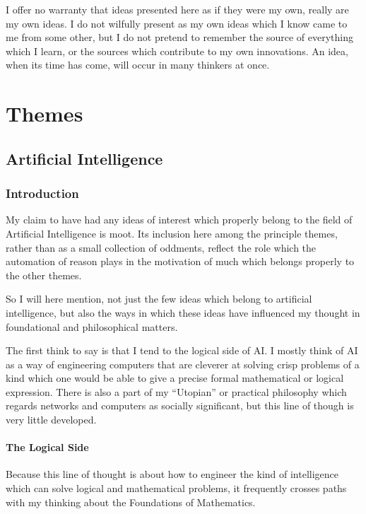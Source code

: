 \documentclass[10pt,titlepage]{book}
\begin{document}
I offer no warranty that ideas presented here as if they were my own, really are my own ideas.
I do not wilfully present as my own ideas which I know came to me from some other, but I do not pretend to remember the source of everything which I learn, or the sources which contribute to my own innovations.
An idea, when its time has come, will occur in many thinkers at once.

\part{Themes}

\chapter{Artificial Intelligence}

\section{Introduction}

My claim to have had any ideas of interest which properly belong to the field of Artificial Intelligence is moot.
Its inclusion here among the principle themes, rather than as a small collection of oddments, reflect the role which the automation of reason plays in the motivation of much which belongs properly to the other themes.

So I will here mention, not just the few ideas which belong to artificial intelligence, but also the ways in which these ideas have influenced my thought in foundational and philosophical matters.

The first think to say is that I tend to the logical side of AI.
I mostly think of AI as a way of engineering computers that are cleverer at solving crisp problems of a kind which one would be able to give a precise formal mathematical or logical expression.
There is also a part of my ``Utopian'' or practical philosophy which regards networks and computers as socially significant, but this line of though is very little developed.

\subsection{The Logical Side}

Because this line of thought is about how to engineer the kind of intelligence which can solve logical and mathematical problems, it frequently crosses paths with my thinking about the Foundations of Mathematics.
\end{document}
